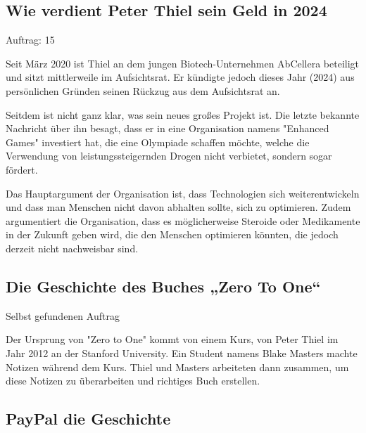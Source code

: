 \documentclass[10pt]{article}
\begin{document}
\subsection*{Wie verdient Peter Thiel sein Geld in 2024}

\begin{description}
    \item[Auftrag: 15]
\end{description}

Seit März 2020 ist Thiel an dem jungen Biotech-Unternehmen AbCellera beteiligt und sitzt mittlerweile im Aufsichtsrat. Er kündigte jedoch dieses Jahr (2024) aus persönlichen Gründen seinen Rückzug aus dem Aufsichtsrat an.

Seitdem ist nicht ganz klar, was sein neues großes Projekt ist. Die letzte bekannte Nachricht über ihn besagt, dass er in eine Organisation namens "Enhanced Games" investiert hat, die eine Olympiade schaffen möchte, welche die Verwendung von leistungssteigernden Drogen nicht verbietet, sondern sogar fördert.

Das Hauptargument der Organisation ist, dass Technologien sich weiterentwickeln und dass man Menschen nicht davon abhalten sollte, sich zu optimieren. Zudem argumentiert die Organisation, dass es möglicherweise Steroide oder Medikamente in der Zukunft geben wird, die den Menschen optimieren könnten, die jedoch derzeit nicht nachweisbar sind.

\subsection*{Die Geschichte des Buches „Zero To One“}

\begin{description}
    \item[Selbst gefundenen Auftrag]
\end{description}

Der Ursprung von "Zero to One" kommt von einem Kurs, von Peter Thiel im Jahr 2012 an der Stanford University. Ein Student namens Blake Masters machte Notizen während dem Kurs. Thiel und Masters arbeiteten dann zusammen, um diese Notizen zu überarbeiten und richtiges Buch erstellen.

\subsection*{PayPal die Geschichte}
\end{document}
